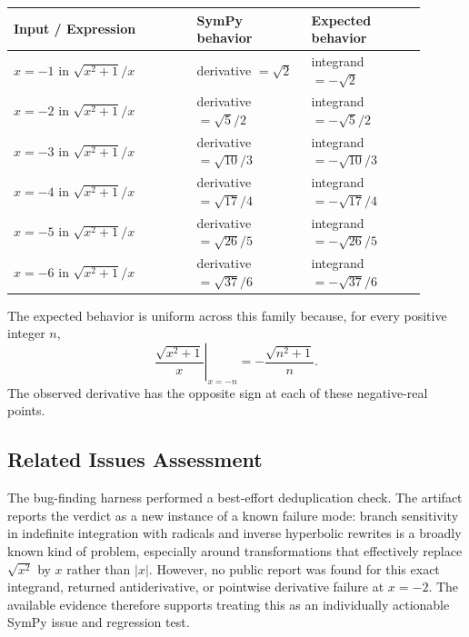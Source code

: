 \documentclass[11pt]{article}
\begin{document}
\begin{center}
\renewcommand{\arraystretch}{1.3}
\begin{tabular}{@{}>{\raggedright\arraybackslash}p{0.40\linewidth}>{\raggedright\arraybackslash}p{0.25\linewidth}>{\raggedright\arraybackslash}p{0.25\linewidth}@{}}
\toprule
\textbf{Input / Expression} & \textbf{SymPy behavior} & \textbf{Expected behavior} \\
\midrule
\(x=-1\) in \(\sqrt{x^2+1}/x\) & derivative \(=\sqrt{2}\) & integrand \(=-\sqrt{2}\) \\
\(x=-2\) in \(\sqrt{x^2+1}/x\) & derivative \(=\sqrt{5}/2\) & integrand \(=-\sqrt{5}/2\) \\
\(x=-3\) in \(\sqrt{x^2+1}/x\) & derivative \(=\sqrt{10}/3\) & integrand \(=-\sqrt{10}/3\) \\
\(x=-4\) in \(\sqrt{x^2+1}/x\) & derivative \(=\sqrt{17}/4\) & integrand \(=-\sqrt{17}/4\) \\
\(x=-5\) in \(\sqrt{x^2+1}/x\) & derivative \(=\sqrt{26}/5\) & integrand \(=-\sqrt{26}/5\) \\
\(x=-6\) in \(\sqrt{x^2+1}/x\) & derivative \(=\sqrt{37}/6\) & integrand \(=-\sqrt{37}/6\) \\
\bottomrule
\end{tabular}
\end{center}

The expected behavior is uniform across this family because, for every positive
integer \(n\),
\[
    \left.\frac{\sqrt{x^2+1}}{x}\right|_{x=-n}
    =
    -\frac{\sqrt{n^2+1}}{n}.
\]
The observed derivative has the opposite sign at each of these negative-real
points.

\subsection{Related Issues Assessment}

The bug-finding harness performed a best-effort deduplication check. The
artifact reports the verdict as a new instance of a known failure mode: branch
sensitivity in indefinite integration with radicals and inverse hyperbolic
rewrites is a broadly known kind of problem, especially around transformations
that effectively replace \(\sqrt{x^2}\) by \(x\) rather than \(|x|\). However,
no public report was found for this exact integrand, returned antiderivative, or
pointwise derivative failure at \(x=-2\). The available evidence therefore
supports treating this as an individually actionable SymPy issue and regression
test.
\end{document}
